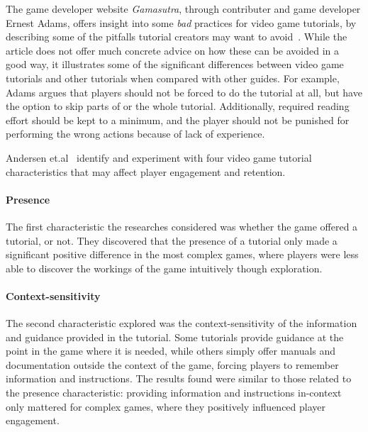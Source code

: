 \noindent
The game developer website \emph{Gamasutra}, through contributer and game developer Ernest Adams, offers insight into some \emph{bad} practices for video game tutorials, by describing some of the pitfalls tutorial creators may want to avoid~\cite{adams:bad_tutorial}. While the article does not offer much concrete advice on how these can be avoided in a good way, it illustrates some of the significant differences between video game tutorials and other tutorials when compared with other guides. For example, Adams argues that players should not be forced to do the tutorial at all, but have the option to skip parts of or the whole tutorial. Additionally, required reading effort should be kept to a minimum, and the player should not be punished for performing the wrong actions because of lack of experience.

\noindent
Andersen et.al~\cite{andersen:tutorials_impact} identify and experiment with four video game tutorial characteristics that may affect player engagement and retention.

\paragraph{Presence} The first characteristic the researches considered was whether the game offered a tutorial, or not. They discovered that the presence of a tutorial only made a significant positive difference in the most complex games, where players were less able to discover the workings of the game intuitively though exploration.

\paragraph{Context-sensitivity} The second characteristic explored was the context-sensitivity of the information and guidance provided in the tutorial. Some tutorials provide guidance at the point in the game where it is needed, while others simply offer manuals and documentation outside the context of the game, forcing players to remember information and instructions. The results found were similar to those related to the presence characteristic: providing information and instructions in-context only mattered for complex games, where they positively influenced player engagement.

